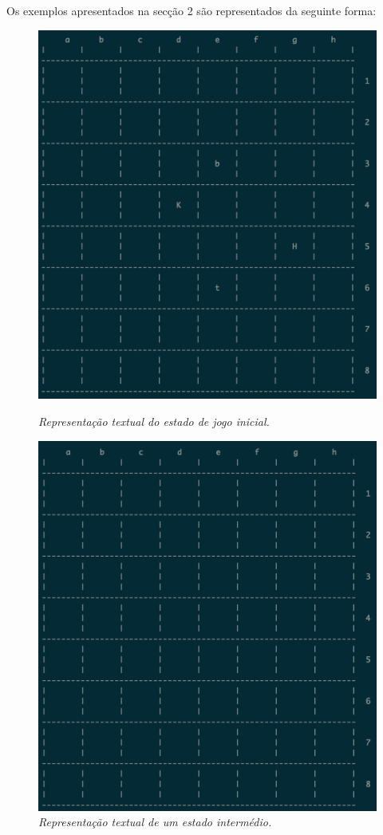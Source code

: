 \documentclass[a4paper]{article}
\begin{document}
Os exemplos apresentados na secção 2 são representados da seguinte forma:

\begin{small}
\begin{figure}[!htb]
\includegraphics[scale=0.4]{board-texto-1.png}
\caption{\textit{ Representação textual do estado de jogo inicial.}}
\label{fig:fig5}
\endminipage\hfill
{}
\includegraphics[scale=0.4]{board-texto-2.png}
\caption{\textit{ Representação textual de um estado intermédio.}}
\label{fig:fig6}
\endminipage
\end{figure}
\end{small}
\end{document}
